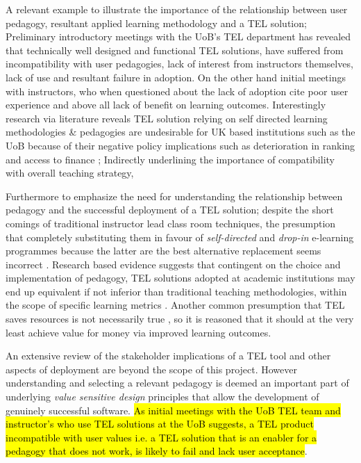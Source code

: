 A relevant example to illustrate the importance of the relationship between user pedagogy, resultant applied learning methodology and a TEL solution; Preliminary introductory meetings with the UoB's TEL department has revealed that technically well designed and functional TEL solutions, have suffered from incompatibility with user pedagogies, lack of interest from instructors themselves, lack of use and resultant failure in adoption. On the other hand initial meetings with instructors, who when questioned about the lack of adoption cite poor user experience and above all lack of benefit on learning outcomes. Interestingly research via literature reveals TEL solution relying on self directed learning methodologies \& pedagogies are undesirable for UK based institutions such as the UoB because of their negative policy implications such as deterioration in ranking and access to finance \cite{Gordon2014}; Indirectly underlining the importance of compatibility with overall teaching strategy,

Furthermore to emphasize the need for understanding the relationship between pedagogy and the successful deployment of a TEL solution; despite the short comings of traditional instructor lead class room techniques,  the presumption that  completely substituting them in favour of \textit{self-directed} and \textit{drop-in} e-learning programmes because the latter are the  best alternative replacement seems incorrect \cite{RickReis,Team2008} . Research based evidence suggests that contingent on the choice and implementation of pedagogy,  TEL solutions adopted at academic institutions may end up equivalent if not inferior than traditional teaching   methodologies, within the scope of specific learning metrics \cite{RickReis,Means2009,Team2008}. Another common presumption that TEL saves resources is not necessarily true \cite{Gordon2014,Hackelbusch2007}, so it is reasoned that it should at the very least achieve value for money via improved learning outcomes.

An extensive review of the stakeholder implications of a TEL tool and other aspects of deployment are beyond the scope of this project. However understanding and selecting a relevant pedagogy is deemed an important part of underlying \textit{value sensitive design} \cite{Mahamuni2015} principles that allow the development of genuinely successful software. \hl{As initial meetings with the UoB TEL team and instructor's who use TEL solutions at the UoB suggests, a TEL product incompatible with user values i.e. a TEL solution that is an enabler for a pedagogy that does not work, is likely to fail and lack user acceptance}.




